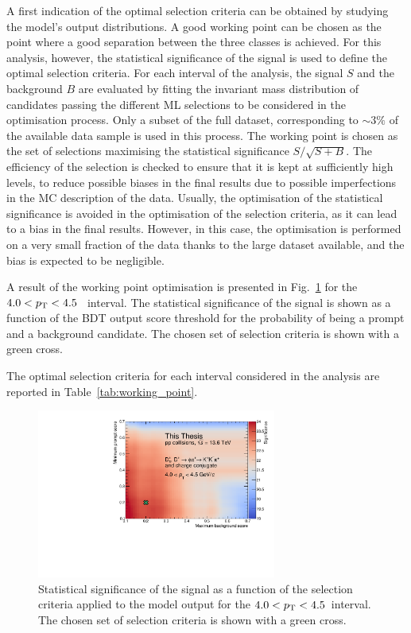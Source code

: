 A first indication of the optimal selection criteria can be obtained by studying the model's output distributions. A good working point can be chosen as the point where a good separation between the three classes is achieved. For this analysis, however, the statistical significance of the signal is used to define the optimal selection criteria. For each \pt interval of the analysis, the signal $S$ and the background $B$ are evaluated by fitting the invariant mass distribution of candidates passing the different ML selections to be considered in the optimisation process. Only a subset of the full dataset, corresponding to $\sim 3\%$ of the available data sample is used in this process. The working point is chosen as the set of selections maximising the statistical significance $S/\sqrt{S+B}$. The efficiency of the selection is checked to ensure that it is kept at sufficiently high levels, to reduce possible biases in the final results due to possible imperfections in the MC description of the data. Usually, the optimisation of the statistical significance is avoided in the optimisation of the selection criteria, as it can lead to a bias in the final results. However, in this case, the optimisation is performed on a very small fraction of the data thanks to the large dataset available, and the bias is expected to be negligible.

A result of the working point optimisation is presented in Fig.~\ref{fig:ml_significance} for the \mbox{$4.0<p_\mathrm{T}<4.5$~\gevc} interval. The statistical significance of the signal is shown as a function of the BDT output score threshold for the probability of being a prompt \ds and a background candidate. The chosen set of selection criteria is shown with a green cross.

The optimal selection criteria for each \pt interval considered in the analysis are reported in Table~\ref{tab:working_point}.


\begin{figure}
    \centering
    \includegraphics[width=0.7\textwidth]{Figures/Chapter 5/Significance_Scan.pdf}
    \caption{Statistical significance of the signal as a function of the selection criteria applied to the model output for the $4.0<p_\mathrm{T}<4.5$~\gevc interval. The chosen set of selection criteria is shown with a green cross.}
    \label{fig:ml_significance}
\end{figure}

